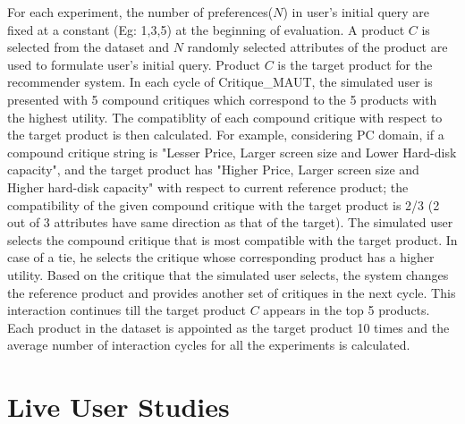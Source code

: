 For each experiment, the number of preferences($N$) in user's initial query are fixed at a constant (Eg: 1,3,5) at the beginning of evaluation.
A product $C$ is selected from the dataset and $N$ randomly selected attributes of the product are used to formulate user's initial query.
Product $C$ is the target product for the recommender system.
In each cycle of Critique\_MAUT, the simulated user is presented with 5 compound critiques which correspond to the 5 products with the highest utility.
The compatiblity of each compound critique with respect to the target product is then calculated.
For example, considering PC domain, if a compound critique string is "Lesser Price, Larger screen size and Lower Hard-disk capacity", and the target product has "Higher Price, Larger screen size and Higher hard-disk capacity" with respect to current reference product; the compatibility of the given compound critique with the target product is 2/3 (2 out of 3 attributes have same direction as that of the target).
The simulated user selects the compound critique that is most compatible with the target product.
In case of a tie, he selects the critique whose corresponding product has a higher utility.
Based on the critique that the simulated user selects, the system changes the reference product and provides another set of critiques in the next cycle.
This interaction continues till the target product $C$ appears in the top 5 products.
Each product in the dataset is appointed as the target product 10 times and the average number of interaction cycles for all the experiments is calculated.


\section{Live User Studies}
\label{sec:liveUser}

